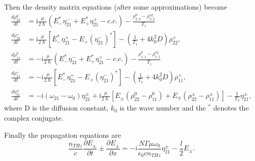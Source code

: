 \documentclass[preprint,secnumarabic,amssymb, nobibnotes, aip, prd]{revtex4-1}
\begin{document}
Then the density matrix equations (after some approximations) become 
\begin{align}
\frac{d\rho_{22}^{0}}{dt} &= \mathrm{i}\frac{\mu}{2\hslash}\left(  E_{-}^{\ast}\eta_{21}^{-}+E_{+}^{\ast}\eta_{21}^{+}-c.c.\right) -\frac{\rho_{2,2}^{0}-\rho_{2,2}^{eq}}{T_1} \\
\frac{d\rho_{22}^{+}}{dt} &= \mathrm{i}\frac{\mu}{2\hslash}\left[  E_{-}^{\ast}\eta_{21}^{+}-E_{+}(\eta_{21}^{-})^{\ast}\right] - \left( \frac{1}{T_1}+4k_{0}^{2}D\right)  \rho_{22}^{+},\label{eq:rtpop3grating}\\
\frac{d\rho_{11}^{0}}{dt} &=-\mathrm{i}\frac{\mu}{2\hslash}\left(E_{-}^{\ast}\eta_{21}^{-}+E_{+}^{\ast}\eta_{21}^{+}-c.c.\right) -\frac{\rho_{1,1}^{0}-\rho_{1,1}^{eq}}{T_1} \\
\frac{d\rho_{11}^{+}}{dt} &=-\mathrm{i}\frac{\mu}{2\hslash}\left[E_{-}^{\ast}\eta_{21}^{+}-E_{+}(\eta_{21}^{-})^{\ast}\right] -\left(  \frac{1}{T_1}+4k_{0}^{2}D\right) \rho_{11}^{+}, \label{eq:rtpop2grating} \\
\frac{d\eta_{21}^{\pm}}{dt} & = -\mathrm{i}\left(  \omega_{21}-\omega_{0}\right) \eta_{21}^{\pm}+\mathrm{i}\frac{\mu}{2\hslash}\left[  E_{\pm}(\rho_{22}^{0}-\rho_{11}^{0})+E_{\mp}(\rho_{22}^{\pm}-\rho_{11}^{\pm})\right]-\frac{1}{T_2}\eta_{21}^{\pm},
\end{align}
where D is the diffusion constant, $k_0$ is the wave number and the $^{\ast}$ denotes the complex conjugate.

Finally the propagation equations are
\begin{equation}
\frac{n_{THz}}{c}\frac{\partial E_{\pm}}{\partial {t}}\pm\frac{\partial E_{\pm}}{\partial {x}}=-i\frac{N\Gamma\mu\omega_0}{\epsilon_0 c n_{THz}}\eta_{21}^{\pm}-\frac{l}{2}E_{\pm
}. \label{eq:rtwave}%
\end{equation}	





\end{document}

